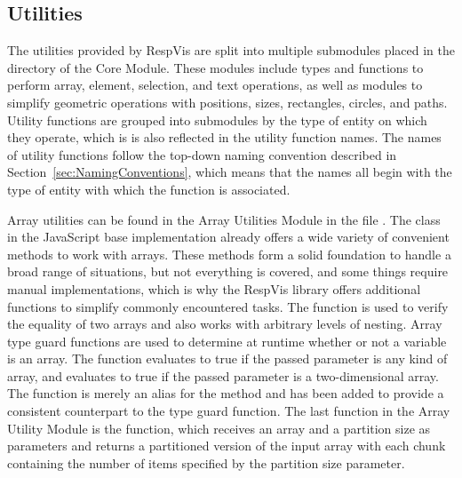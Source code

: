\subsection{Utilities}

The utilities provided by RespVis are split into multiple submodules
placed in the  directory of the Core Module. These
modules include types and functions to perform array, element,
selection, and text operations, as well as modules to simplify
geometric operations with positions, sizes, rectangles, circles, and
paths.  Utility functions are grouped into submodules by the type of
entity on which they operate, which is is also reflected in the
utility function names.  The names of utility functions follow the
top-down naming convention described in
Section~\ref{sec:NamingConventions}, which means that the names all
begin with the type of entity with which the function is associated.

Array utilities can be found in the Array Utilities Module in the file
.  The  class in the JavaScript
base implementation already offers a wide variety of convenient
methods to work with arrays.  These methods form a solid foundation to
handle a broad range of situations, but not everything is covered, and
some things require manual implementations, which is why the RespVis
library offers additional functions to simplify commonly encountered
tasks.  The  function is used to verify the equality
of two arrays and also works with arbitrary levels of nesting. Array
type guard functions are used to determine at runtime whether or not a
variable is an array. The function  evaluates to true if
the passed parameter is any kind of array, and 
evaluates to true if the passed parameter is a two-dimensional array.
The  function is merely an alias for the
 method and has been added to provide a consistent
counterpart to the  type guard function. The last
function in the Array Utility Module is the 
function, which receives an array and a partition size as parameters
and returns a partitioned version of the input array with each chunk
containing the number of items specified by the partition size
parameter.


